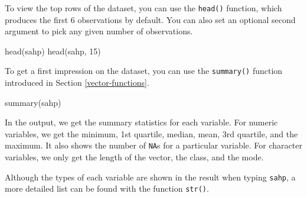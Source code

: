 \documentclass[
]{book}
\newenvironment{Shaded}{\begin{snugshade}}{\end{snugshade}}
\newcommand{\CommentTok}[1]{\textcolor[rgb]{0.56,0.35,0.01}{\textit{#1}}}
\newcommand{\DecValTok}[1]{\textcolor[rgb]{0.00,0.00,0.81}{#1}}
\newcommand{\FunctionTok}[1]{\textcolor[rgb]{0.00,0.00,0.00}{#1}}
\newcommand{\NormalTok}[1]{#1}
\begin{document}
To view the top rows of the dataset, you can
use the \texttt{head()} function, which produces the first 6 observations by default. You can also set an optional second argument to pick any given number of observations.

\begin{Shaded}
\begin{Highlighting}[]
\FunctionTok{head}\NormalTok{(sahp)}
\FunctionTok{head}\NormalTok{(sahp, }\DecValTok{15}\NormalTok{)}
\end{Highlighting}
\end{Shaded}

To get a first impression on the dataset, you can use the \texttt{summary()} function introduced in Section \ref{vector-functions}.

\begin{Shaded}
\begin{Highlighting}[]
\FunctionTok{summary}\NormalTok{(sahp)}
\end{Highlighting}
\end{Shaded}

In the output, we get the summary statistics for each variable. For numeric variables, we get the minimum, 1st quartile, median, mean, 3rd quartile, and the maximum. It also shows the number of \texttt{NA}s for a particular variable. For character variables, we only get the length of the vector, the class, and the mode.

Although the types of each variable are shown in the result when typing \texttt{sahp}, a more detailed list can be found with the function \texttt{str()}.

\begin{Shaded}
\end{Shaded}
\end{document}
